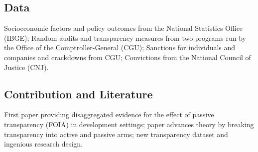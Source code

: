 \documentclass[]{article}
\begin{document}
\hypertarget{data}{%
\subsection{Data}\label{data}}

Socioeconomic factors and policy outcomes from the National Statistics
Office (IBGE); Random audits and transparency measures from two programs
run by the Office of the Comptroller-General (CGU); Sanctions for
individuals and companies and crackdowns from CGU; Convictions from the
National Council of Justice (CNJ).

\hypertarget{contribution-and-literature}{%
\subsection{Contribution and
Literature}\label{contribution-and-literature}}

First paper providing disaggregated evidence for the effect of passive
transparency (FOIA) in development settings; paper advances theory by
breaking transparency into active and passive arms; new transparency
dataset and ingenious research design.
\end{document}
